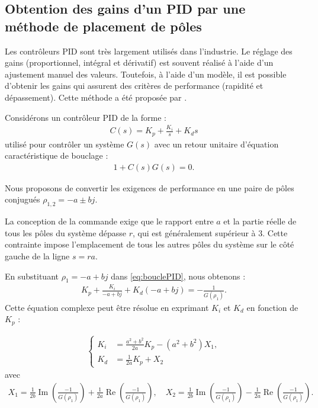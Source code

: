 \subsection*{Obtention des gains d'un PID par une méthode de placement de pôles \cite{WANG2008PID}}
Les contrôleurs PID sont très largement utilisés dans l'industrie. Le réglage des gains (proportionnel, intégral et dérivatif) est souvent réalisé à l'aide d'un ajustement manuel des valeurs. Toutefois, à l'aide d'un modèle, il est possible d'obtenir les gains qui assurent des critères de performance (rapidité et dépassement). Cette méthode a été proposée par \cite{WANG2008PID}.

Considérons un contrôleur PID de la forme :
\begin{align}
    C(s) = K_{p} +  \frac{K_{i}}{s} + K_{d} s
\end{align}
utilisé pour contrôler un système $G(s)$ avec un retour unitaire d'équation caractéristique de bouclage :
\begin{align}
    \label{eq:bouclePID}
    1+ C(s)G(s) = 0.
\end{align}

Nous proposons de convertir les exigences de performance en une paire de pôles conjugués $\rho_{1,2} = -a \pm bj$.

La conception de la commande exige que le rapport entre $a$ et la partie réelle de tous les pôles du système dépasse $r$, qui est généralement supérieur à 3. Cette contrainte impose l'emplacement de tous les autres pôles du système sur le côté gauche de la ligne $s = ra$.

En substituant  $\rho_{1} = -a + bj$ dans \eqref{eq:bouclePID}, nous obtenons : 
\begin{align}
    K_{p} +  \frac{K_{i}}{-a + bj} + K_{d} (-a + bj) = -\frac{1}{G(\rho_{1})}.
\end{align}
Cette équation complexe peut être résolue en exprimant $K_{i}$ et $K_{d}$ en fonction de $K_{p}$ :

\begin{align}
    \label{eq:simplifyPID}
    \left\{
        \begin{aligned}
            K_{i} &= \frac{a^{2} + b^{2}}{2a} K_{p} - (a^{2} + b^{2}) X_{1},\\
            K_{d} &= \frac{1}{2a} K_{p} + X_{2}
        \end{aligned}
      \right.
  \end{align}
  avec 
  \begin{align*}
    X_{1} = \frac{1}{2b} \operatorname{Im}(\frac{-1}{G(\rho_{1})})+ \frac{1}{2a} \operatorname{Re}(\frac{-1}{G(\rho_{1})}), \quad X_{2} = \frac{1}{2b} \operatorname{Im}(\frac{-1}{G(\rho_{1})})- \frac{1}{2a} \operatorname{Re}(\frac{-1}{G(\rho_{1})}).
  \end{align*}

